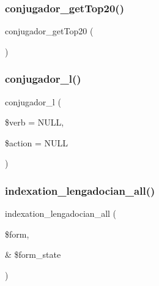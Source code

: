 \subsubsection{\texorpdfstring{conjugador\+\_\+get\+Top20()}{conjugador\_getTop20()}}
{\footnotesize\ttfamily conjugador\+\_\+get\+Top20 (\begin{DoxyParamCaption}{ }\end{DoxyParamCaption})}

\hypertarget{php_2conjoc__web_form_8inc_aab99a7a60692cf7228d4a79924c32cb2}{}\label{php_2conjoc__web_form_8inc_aab99a7a60692cf7228d4a79924c32cb2} 
\subsubsection{\texorpdfstring{conjugador\+\_\+l()}{conjugador\_l()}}
{\footnotesize\ttfamily conjugador\+\_\+l (\begin{DoxyParamCaption}\item[{}]{\$verb = {\ttfamily NULL},  }\item[{}]{\$action = {\ttfamily NULL} }\end{DoxyParamCaption})}

\hypertarget{php_2conjoc__web_form_8inc_a465cce16b0d09f364ccb546c46c82306}{}\label{php_2conjoc__web_form_8inc_a465cce16b0d09f364ccb546c46c82306} 
\subsubsection{\texorpdfstring{indexation\+\_\+lengadocian\+\_\+all()}{indexation\_lengadocian\_all()}}
{\footnotesize\ttfamily indexation\+\_\+lengadocian\+\_\+all (\begin{DoxyParamCaption}\item[{}]{\$form,  }\item[{\&}]{\$form\+\_\+state }\end{DoxyParamCaption})}

\hypertarget{php_2conjoc__web_form_8inc_a9c7725a828c1a44761bc51fe7a346215}{}\label{php_2conjoc__web_form_8inc_a9c7725a828c1a44761bc51fe7a346215} 
